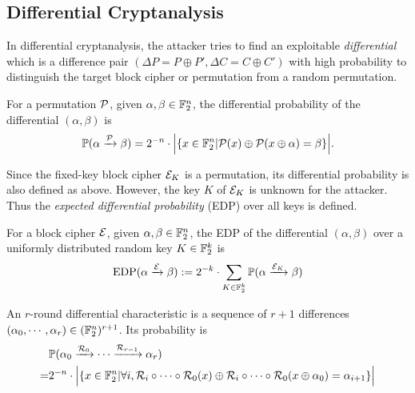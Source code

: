 \subsection{Differential Cryptanalysis}

In differential cryptanalysis, the attacker tries to find an exploitable \textit{differential} which is a difference pair $(\Delta P=P\oplus P',\Delta C=C\oplus C')$ with high probability to distinguish the target block cipher or permutation from a random permutation. 

\begin{definition}
    For a permutation $\mathcal{P}$, given $\alpha,\beta\in \mathbb{F}_2^n$, the differential probability of the differential $(\alpha,\beta)$ is
    \begin{align*}
        \mathbb{P}(\alpha\xrightarrow{\mathcal{P}}\beta)=2^{-n}\cdot\Big|\{x\in\mathbb{F}_2^n|\mathcal{P}(x)\oplus\mathcal{P}(x\oplus\alpha)=\beta\}\Big|.
    \end{align*}
\end{definition}

Since the fixed-key block cipher $\mathcal{E}_K$ is a permutation, its differential probability is also defined as above. However, the key $K$ of $\mathcal{E}_K$ is unknown for the attacker. Thus the \textit{expected differential probability} (EDP) over all keys is defined.

\begin{definition}
    For a block cipher $\mathcal{E}$, given $\alpha,\beta\in \mathbb{F}_2^n$, the EDP of the differential $(\alpha,\beta)$ over a uniformly distributed random key $K\in \mathbb{F}_2^k$ is 
    \begin{align*}
        \text{EDP}(\alpha\xrightarrow{\mathcal{E}}\beta):=2^{-k}\cdot\sum\limits_{K\in \mathbb{F}_2^k}\mathbb{P}(\alpha\xrightarrow{\mathcal{E}_K}\beta)
    \end{align*}
\end{definition}

\begin{definition}
    An $r$-round differential characteristic is a sequence of $r+1$ differences $(\alpha_0,\cdots,\alpha_r)\in(\mathbb{F}_2^n)^{r+1}$. Its probability is
    \begin{align*}
        &\mathbb{P}(\alpha_0\xrightarrow{\mathcal{R}_0}\cdots\xrightarrow{\mathcal{R}_{r-1}}\alpha_r)\\
        =&2^{-n}\cdot\Big|\{x\in\mathbb{F}_2^n|\forall i, \mathcal{R}_i\circ\cdots\circ\mathcal{R}_0(x)\oplus\mathcal{R}_i\circ\cdots\circ\mathcal{R}_0(x\oplus\alpha_0)=\alpha_{i+1}\}\Big|\\
    \end{align*}
\end{definition}

